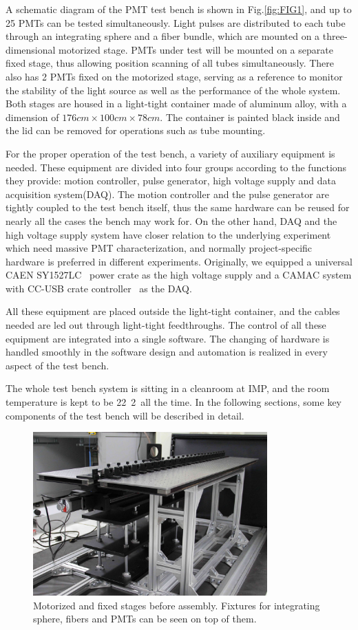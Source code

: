 \documentclass[preprint, times]{elsarticle}
\begin{document}
A schematic diagram of the PMT test bench is shown in Fig.\ref{fig:FIG1}, and up to 25 PMTs can be tested simultaneously.
Light pulses are distributed to each tube through an integrating sphere and a fiber bundle, which are mounted on a three-dimensional motorized stage.
PMTs under test will be mounted on a separate fixed stage, thus allowing position scanning of all tubes simultaneously.
There also has 2 PMTs fixed on the motorized stage, serving as a reference to monitor the stability of the light source as well as the performance of the whole system.
Both stages are housed in a light-tight container made of aluminum alloy, with a dimension of $176cm\times100cm\times78cm$.
The container is painted black inside and the lid can be removed for operations such as tube mounting.

For the proper operation of the test bench, a variety of auxiliary equipment is needed. 
These equipment are divided into four groups according to the functions they provide: motion controller, pulse generator, high voltage supply and data acquisition system(DAQ).
The motion controller and the pulse generator are tightly coupled to the test bench itself, thus the same hardware can be reused for nearly all the cases the bench may work for.
On the other hand, DAQ and the high voltage supply system have closer relation to the underlying experiment which need massive PMT characterization, and normally project-specific hardware is preferred in different experiments. 
Originally, we equipped a universal CAEN SY1527LC~\cite{sy1527lc} power crate as the high voltage supply and a CAMAC system with CC-USB crate controller~\cite{cc_usb} as the DAQ.

All these equipment are placed outside the light-tight container, and the cables needed are led out through light-tight feedthroughs.
The control of all these equipment are integrated into a single software. The changing of hardware is handled smoothly in the software design and automation is realized in every aspect of the test bench.

The whole test bench system is sitting in a cleanroom at IMP, and the room temperature is kept to be 22\textpm~2\textcelsius~all the time. 
In the following sections, some key components of the test bench will be described in detail.

\begin{figure}
 \centering
 \includegraphics[width=90mm]{FIG2}
\caption{Motorized and fixed stages before assembly.
Fixtures for integrating sphere, fibers and PMTs can be seen on top of them.}
\label{fig:FIG2}
\end{figure} 
\end{document}
